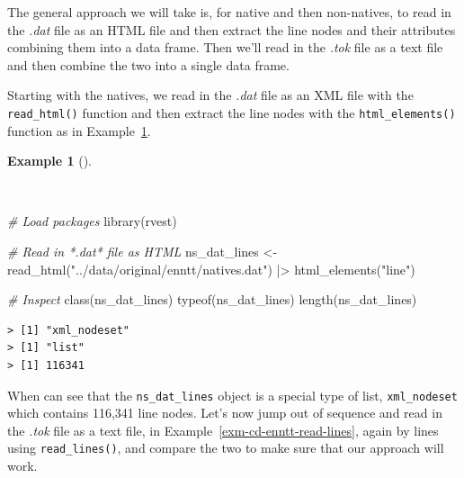 \documentclass[
  letterpaper,
]{latex/krantz}
\newenvironment{Shaded}{\begin{snugshade}}{\end{snugshade}}
\newcommand{\CommentTok}[1]{\textcolor[rgb]{0.00,0.00,0.00}{\textit{#1}}}
\newcommand{\FunctionTok}[1]{\textcolor[rgb]{0.00,0.00,0.00}{#1}}
\newcommand{\NormalTok}[1]{\textcolor[rgb]{0.00,0.00,0.00}{#1}}
\newcommand{\OtherTok}[1]{\textcolor[rgb]{0.00,0.00,0.00}{#1}}
\newcommand{\SpecialCharTok}[1]{\textcolor[rgb]{0.00,0.00,0.00}{#1}}
\newcommand{\StringTok}[1]{\textcolor[rgb]{0.00,0.00,0.00}{#1}}
\theoremstyle{definition}
\newtheorem{example}{Example}[chapter]
\theoremstyle{remark}
\begin{document}
The general approach we will take is, for native and then non-natives,
to read in the \emph{.dat} file as an HTML file and then extract the
line nodes and their attributes combining them into a data frame. Then
we'll read in the \emph{.tok} file as a text file and then combine the
two into a single data frame.

Starting with the natives, we read in the \emph{.dat} file as an XML
file with the \texttt{read\_html()} function and then extract the line
nodes with the \texttt{html\_elements()} function as in
Example~\ref{exm-cd-enntt-read-xml}.

\begin{example}[]\protect\hypertarget{exm-cd-enntt-read-xml}{}\label{exm-cd-enntt-read-xml}

~

\begin{Shaded}
\begin{Highlighting}[]
\CommentTok{\# Load packages}
\FunctionTok{library}\NormalTok{(rvest)}

\CommentTok{\# Read in *.dat* file as HTML}
\NormalTok{ns\_dat\_lines }\OtherTok{\textless{}{-}}
  \FunctionTok{read\_html}\NormalTok{(}\StringTok{"../data/original/enntt/natives.dat"}\NormalTok{) }\SpecialCharTok{|\textgreater{}}
  \FunctionTok{html\_elements}\NormalTok{(}\StringTok{"line"}\NormalTok{)}

\CommentTok{\# Inspect}
\FunctionTok{class}\NormalTok{(ns\_dat\_lines)}
\FunctionTok{typeof}\NormalTok{(ns\_dat\_lines)}
\FunctionTok{length}\NormalTok{(ns\_dat\_lines)}
\end{Highlighting}
\end{Shaded}

\begin{verbatim}
> [1] "xml_nodeset"
> [1] "list"
> [1] 116341
\end{verbatim}

\end{example}

When can see that the \texttt{ns\_dat\_lines} object is a special type
of list, \texttt{xml\_nodeset} which contains 116,341 line nodes. Let's
now jump out of sequence and read in the \emph{.tok} file as a text
file, in Example~\ref{exm-cd-enntt-read-lines}, again by lines using
\texttt{read\_lines()}, and compare the two to make sure that our
approach will work.
\end{document}
